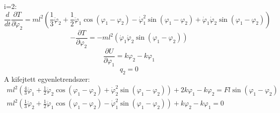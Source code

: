 \documentclass[12pt,twoside]{article}
\begin{document}
i=2:
\begin{equation} \label{eq:Newton}
\frac{d}{dt}\frac{\partial T}{\partial \dot \varphi_2}=
ml^2\left(\frac{1}{3} \ddot \varphi_2+\frac{1}{2}\ddot \varphi_1 \cos{(\varphi_1-\varphi_2)}-\dot\varphi_1^2\sin{(\varphi_1-\varphi_2)}+\dot\varphi_1\dot\varphi_2\sin{(\varphi_1-\varphi_2)}\right)
\end{equation}
\begin{equation} \label{eq:Newton}
-\frac{\partial T}{\partial \varphi_2}=-ml^2\left(\dot\varphi_1\dot\varphi_2\sin{(\varphi_1-\varphi_2)}\right)
\end{equation}
\begin{equation} \label{eq:Newton}
\frac{\partial U}{\partial \varphi_1}=k\varphi_2-k\varphi_1
\end{equation}
\begin{equation} \label{eq:Newton}
q_2 =0
\end{equation}
A kifejtett egyenletrendszer:
\begin{equation} \label{eq:Newton}
\begin{array}{rcl} 
ml^2\left(\frac{4}{3} \ddot \varphi_1+\frac{1}{2}\ddot \varphi_2 \cos{(\varphi_1-\varphi_2)}+\dot\varphi_2^2\sin{(\varphi_1-\varphi_2)}\right)+2k\varphi_1-k\varphi_2=Fl \sin{(\varphi_1-\varphi_2)}
\\ 
ml^2\left(\frac{1}{3} \ddot \varphi_2+\frac{1}{2}\ddot \varphi_1 \cos{(\varphi_1-\varphi_2)}-\dot\varphi_1^2\sin{(\varphi_1-\varphi_2)}\right)+k\varphi_2-k\varphi_1=0
\end{array}
\end{equation}
\end{document}
